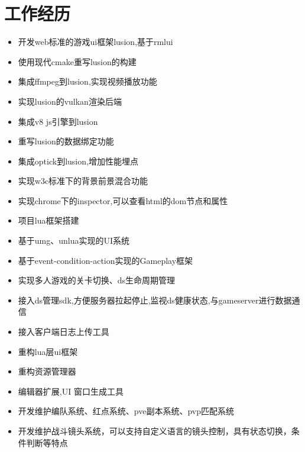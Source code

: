 \documentclass{resume}
\begin{document}
\section{工作经历}
\begin{itemize}
  \item 开发web标准的游戏ui框架lusion,基于rmlui
  \item 使用现代cmake重写lusion的构建
  \item 集成ffmpeg到lusion,实现视频播放功能
  \item 实现lusion的vulkan渲染后端
  \item 集成v8 js引擎到lusion
  \item 重写lusion的数据绑定功能
  \item 集成optick到lusion,增加性能埋点
  \item 实现w3c标准下的背景前景混合功能
  \item 实现chrome下的inspector,可以查看html的dom节点和属性
\end{itemize}
\begin{itemize}
  \item 项目lua框架搭建
  \item 基于umg、unlua实现的UI系统
  \item 基于event-condition-action实现的Gameplay框架
  \item 实现多人游戏的关卡切换、ds生命周期管理
  \item 接入ds管理sdk,方便服务器拉起停止,监视ds健康状态,与gameserver进行数据通信
  \item 接入客户端日志上传工具
\end{itemize}
\begin{itemize}
  \item 重构lua层ui框架
  \item 重构资源管理器
  \item 编辑器扩展,UI 窗口生成工具
  \item 开发维护编队系统、红点系统、pve副本系统、pvp匹配系统
  \item 开发维护战斗镜头系统，可以支持自定义语言的镜头控制，具有状态切换，条件判断等特点
\end{itemize}



%
%
\end{document}
